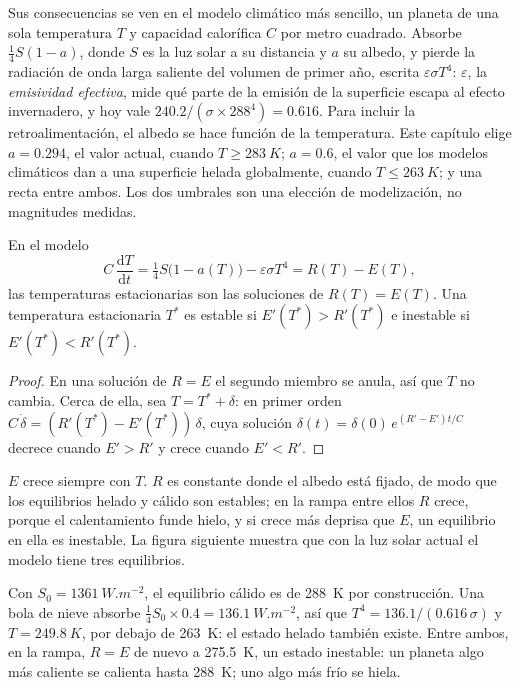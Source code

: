 Sus consecuencias se ven en el modelo climático más sencillo, un planeta de una sola temperatura $T$ y
capacidad calorífica $C$ por metro cuadrado. Absorbe $\tfrac14 S(1 - a)$, donde $S$ es la luz solar
a su distancia y $a$ su albedo, y pierde la radiación de onda larga saliente del volumen de primer
año, escrita $\varepsilon\sigma T^4$: $\varepsilon$, la \emph{emisividad efectiva},
mide qué parte de la emisión de la superficie escapa al efecto invernadero, y hoy vale
$240.2/(\sigma\times288^4) = 0.616$. Para incluir la retroalimentación, el albedo se hace función de
la temperatura. Este capítulo elige $a = 0.294$, el valor actual, cuando $T \ge \qty{283}{K}$; $a
= 0.6$, el valor que los modelos climáticos dan a una superficie helada globalmente, cuando $T \le \qty{263}{K}$; y
una recta entre ambos. Los dos umbrales son una elección de modelización, no magnitudes
medidas.

\begin{proposition}\label{prop:b2:precambrian-earth:ebm}
En el modelo
\[
  C\,\frac{\mathrm dT}{\mathrm dt} = \tfrac14 S\bigl(1 - a(T)\bigr) - \varepsilon\sigma T^4
  = R(T) - E(T),
\]
las temperaturas estacionarias son las soluciones de $R(T) = E(T)$. Una temperatura estacionaria $T^*$ es
estable si $E'(T^*) > R'(T^*)$ e inestable si $E'(T^*) < R'(T^*)$.
\end{proposition}

\begin{proof}
En una solución de $R = E$ el segundo miembro se anula, así que $T$ no cambia. Cerca de ella, sea $T = T^*
+ \delta$: en primer orden $C\,\dot\delta = (R'(T^*) - E'(T^*))\,\delta$, cuya solución
$\delta(t) = \delta(0)\,e^{(R' - E')t/C}$ decrece cuando $E' > R'$ y crece cuando $E' < R'$.
\end{proof}

$E$ crece siempre con $T$. $R$ es constante donde el albedo está fijado, de modo que los equilibrios helado y cálido
son estables; en la rampa entre ellos $R$ crece, porque el calentamiento funde hielo, y si
crece más deprisa que $E$, un equilibrio en ella es inestable. La figura siguiente muestra que con la luz solar
actual el modelo tiene tres equilibrios.

\begin{example}\label{ex:b2:precambrian-earth:three}
Con $S_0 = \qty{1361}{W.m^{-2}}$, el equilibrio cálido es de \qty{288}{K} por construcción. Una
bola de nieve absorbe $\tfrac14 S_0\times0.4 = \qty{136.1}{W.m^{-2}}$, así que $T^4 =
136.1/(0.616\,\sigma)$ y $T = \qty{249.8}{K}$, por debajo de \qty{263}{K}: el estado helado también
existe. Entre ambos, en la rampa, $R = E$ de nuevo a \qty{275.5}{K}, un estado inestable: un
planeta algo más caliente se calienta hasta \qty{288}{K}; uno algo más frío se hiela.
\end{example}

